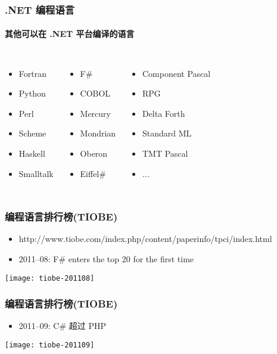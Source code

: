 \begin{frame}
\frametitle{.NET 编程语言}
\framesubtitle{其他可以在 .NET 平台编译的语言 }
\begin{columns}[t]
  \begin{itemize}
    \setlength{\itemsep}{8pt plus 1pt}
  \item Fortran
  \item Python
  \item Perl
  \item Scheme
  \item Haskell
  \item Smalltalk
  \end{itemize}
  \begin{itemize}
    \setlength{\itemsep}{8pt plus 1pt}
  \item F\#
  \item COBOL
  \item Mercury
  \item Mondrian
  \item Oberon
  \item Eiffel\#
  \end{itemize}
  \begin{itemize}
    \setlength{\itemsep}{8pt plus 1pt}
  \item Component Pascal
  \item RPG
  \item Delta Forth
  \item Standard ML
  \item TMT Pascal
  \item $\ldots$
  \end{itemize}
\end{columns}
\end{frame}


\begin{frame}
\frametitle{编程语言排行榜(TIOBE)}
\begin{itemize}
\item {\scriptsize http://www.tiobe.com/index.php/content/paperinfo/tpci/index.html}
\item \small 2011--08: F\# enters the top 20 for the first time
\end{itemize}

\centering\texttt{[image: tiobe-201108]}

\end{frame}

\begin{frame}
\frametitle{编程语言排行榜(TIOBE)}
\begin{itemize}
\item 2011--09: C\# 超过 PHP
\end{itemize}

\centering\texttt{[image: tiobe-201109]}

\end{frame}

